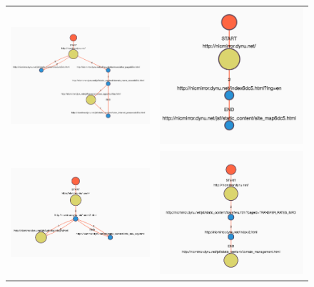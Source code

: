\documentclass[preprint,12pt,3p]{elsarticle}
\begin{document}
\begin{figure}[H]
	\centering
	\begin{tabular}{cc}
		\includegraphics[width = 0.45\columnwidth]{screenshots/clickpath_human} &
		\includegraphics[width = 0.45\columnwidth]{screenshots/clickpath_bots} \\
		
		\includegraphics[width = 0.45\columnwidth]{screenshots/clickpath_human_2} &
		\includegraphics[width = 0.45\columnwidth]{screenshots/clickpath_bots_2} \\
		

\end{tabular}
\end{figure}
\end{document}
